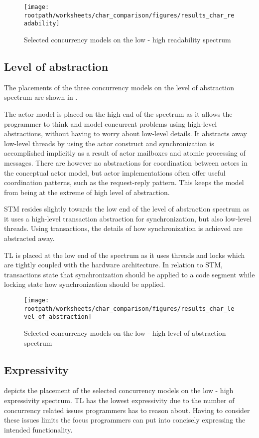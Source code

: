 \begin{figure}[htbp]
\centering
 \texttt{[image: \\rootpath/worksheets/char\_comparison/figures/results\_char\_readability]} 
 \caption{Selected concurrency models on the low - high readability spectrum}
\label{fig:results_char_readability}
\end{figure}

\subsection{Level of abstraction}
The placements of the three concurrency models on the level of abstraction spectrum are shown in .

The actor model is placed on the high end of the spectrum as it allows the programmer to think and model concurrent problems using high-level abstractions, without having to worry about low-level details. It abstracts away low-level threads by using the actor construct and synchronization is accomplished implicitly as a result of actor mailboxes and atomic processing of messages. There are however no abstractions for coordination between actors in the conceptual actor model, but actor implementations often offer useful coordination patterns, such as the request-reply pattern. This keeps the model from being at the extreme of high level of abstraction.

\ac{STM} resides slightly towards the low end of the level of abstraction spectrum as it uses a high-level transaction abstraction for synchronization, but also low-level threads. Using transactions, the details of how synchronization is achieved are abstracted away. 

\ac{TL} is placed at the low end of the spectrum as it uses threads and locks which are tightly coupled with the hardware architecture. In relation to \ac{STM}, transactions state that synchronization should be applied to a code segment while locking state how synchronization should be applied.

\begin{figure}[htbp]
\centering
 \texttt{[image: \\rootpath/worksheets/char\_comparison/figures/results\_char\_level\_of\_abstraction]} 
 \caption{Selected concurrency models on the low - high level of abstraction spectrum}
\label{fig:results_char_level_of_abstraction}
\end{figure}

\subsection{Expressivity}
 depicts the placement of the selected concurrency models on the low - high expressivity spectrum. \ac{TL} has the lowest expressivity due to the number of concurrency related issues programmers has to reason about. Having to consider these issues limits the focus programmers can put into concisely expressing the intended functionality.

